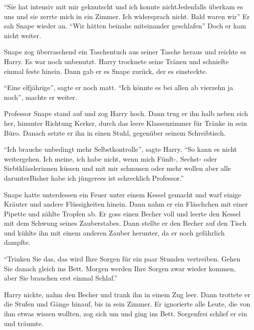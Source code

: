 \enquote{Sie hat intensiv mit mir geknutscht und ich konnte nicht\abs Jedenfalls überkam es uns und sie zerrte mich in ein Zimmer. Ich widersprach nicht. Bald waren wir\abs} Er sah Snape wieder an. \enquote{Wir hätten beinahe miteinander geschlafen\abs} Doch er kam nicht weiter.

Snape zog überraschend ein Taschentuch aus seiner Tasche heraus und reichte es Harry. Es war noch unbenutzt. Harry trocknete seine Tränen und schniefte einmal feste hinein. Dann gab er es Snape zurück, der es einsteckte.

\enquote{Eine elfjährige}, sagte er noch matt. \enquote{Ich könnte es bei allen ab vierzehn ja noch\abs}, machte er weiter.

Professor Snape stand auf und zog Harry hoch. Dann trug er ihn halb neben sich her, hinunter Richtung Kerker, durch das leere Klassenzimmer für Tränke in sein Büro. Danach setzte er ihn in einen Stuhl, gegenüber seinem Schreibtisch.

\enquote{Ich brauche unbedingt mehr Selbstkontrolle}, sagte Harry. \enquote{So kann es nicht weitergehen. Ich meine, ich habe nicht, wenn mich Fünft-, Sechst- oder Siebtklässlerinnen küssen und mit mir schmusen \gst oder mehr wollen \gst aber alle darunter\abs Bisher habe ich jüngere\abs es ist schrecklich Professor.}

Snape hatte unterdessen ein Feuer unter einem Kessel gemacht und warf einige Kräuter und andere Flüssigkeiten hinein. Dann nahm er ein Fläschchen mit einer Pipette und zählte Tropfen ab. Er goss einen Becher voll und leerte den Kessel mit dem Schwung seines Zauberstabes. Dann stellte er den Becher auf den Tisch und kühlte ihn mit einem anderen Zauber herunter, da er noch gefährlich dampfte.

\enquote{Trinken Sie das, das wird Ihre Sorgen für ein paar Stunden vertreiben. Gehen Sie danach gleich ins Bett. Morgen werden Ihre Sorgen zwar wieder kommen, aber Sie brauchen erst einmal Schlaf.}

Harry nickte, nahm den Becher und trank ihn in einem Zug leer. Dann trottete er die Stufen und Gänge hinauf, bis in sein Zimmer. Er ignorierte alle Leute, die von ihm etwas wissen wollten, zog sich um und ging ins Bett. Sorgenfrei schlief er ein und träumte.

